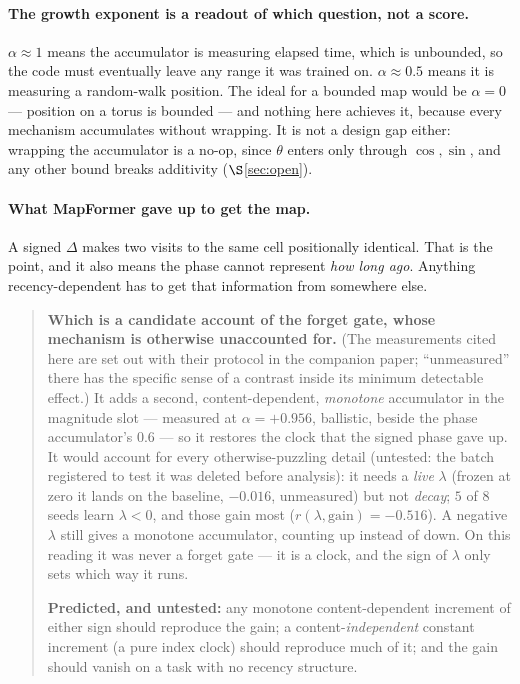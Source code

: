\documentclass[11pt]{article}
\begin{document}
\paragraph{The growth exponent is a readout of which question, not a score.}
$\alpha\approx1$ means the accumulator is measuring elapsed time, which is unbounded,
so the code must eventually leave any range it was trained on. $\alpha\approx0.5$
means it is measuring a random-walk position. The ideal for a bounded map would be
$\alpha = 0$ --- position on a torus is bounded --- and nothing here achieves it,
because every mechanism accumulates without wrapping. It is not a design gap either:
wrapping the accumulator is a no-op, since $\theta$ enters only through $\cos,\sin$,
and any other bound breaks additivity ($\S$\ref{sec:open}).

\paragraph{What MapFormer gave up to get the map.} A signed $\Delta$ makes two
visits to the same cell positionally identical. That is the point, and it also means
the phase cannot represent \emph{how long ago}. Anything recency-dependent has to get
that information from somewhere else.

\begin{quote}\small
\textbf{Which is a candidate account of the forget gate, whose mechanism is otherwise
unaccounted for.} (The measurements cited here are set out with their protocol in
the companion paper; ``unmeasured'' there has the specific sense of a contrast
inside its minimum detectable effect.) It adds a second, content-dependent, \emph{monotone}
accumulator in the magnitude slot --- measured at $\alpha = +0.956$, ballistic,
beside the phase accumulator's $0.6$ --- so it restores the clock that the signed
phase gave up. It would account for every otherwise-puzzling detail (untested: the
batch registered to test it was deleted before analysis): it needs a \emph{live}
$\lambda$ (frozen at zero it lands on the baseline, $-0.016$, unmeasured) but not
\emph{decay}; $5$ of $8$ seeds learn $\lambda<0$, and those gain most
($r(\lambda,\text{gain}) = -0.516$). A negative $\lambda$ still gives a monotone
accumulator, counting up instead of down. On this reading it was never a forget gate
--- it is a clock, and the sign of $\lambda$ only sets which way it runs.

\textbf{Predicted, and untested:} any monotone content-dependent increment of either
sign should reproduce the gain; a content-\emph{independent} constant increment (a
pure index clock) should reproduce much of it; and the gain should vanish on a task
with no recency structure.
\end{quote}
\end{document}
